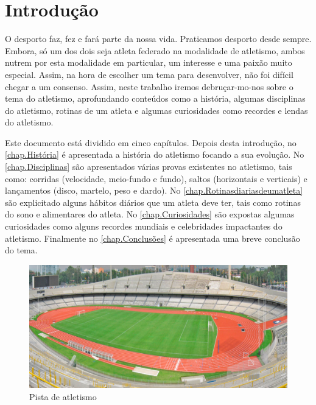 \documentclass{report}
\begin{document}
\clearpage
{}

\chapter{Introdução}
\label{chap.introducao}

O desporto faz, fez e fará parte da nossa vida. Praticamos desporto desde sempre. Embora, só um dos dois seja atleta federado na modalidade de atletismo, ambos nutrem por esta modalidade em particular, um interesse e uma paixão muito especial. Assim, na hora de escolher um tema para desenvolver, não foi difícil chegar a um consenso. Assim, neste trabalho iremos debruçar-mo-nos sobre o tema do atletismo, aprofundando conteúdos como a história, algumas disciplinas do atletismo, rotinas de um atleta e algumas curiosidades como recordes e lendas do atletismo. \par
Este documento está dividido em cinco capítulos.
Depois desta introdução, no \autoref{chap.História} é apresentada a história do atletismo focando a sua evolução. No \autoref{chap.Disciplinas} são apresentados várias provas existentes no atletismo, tais como: corridas (velocidade, meio-fundo e fundo), saltos (horizontais e verticais) e lançamentos (disco, martelo, peso e dardo). No \autoref{chap.Rotinasdiariasdeumatleta} são explicitado alguns hábitos diários que um atleta deve ter, tais como rotinas do sono e alimentares do atleta. No \autoref{chap.Curiosidades} são expostas algumas curiosidades como alguns recordes mundiais e celebridades impactantes do atletismo. Finalmente no \autoref{chap.Conclusões} é apresentada uma breve conclusão do tema.

         \FloatBarrier
            \begin{figure}[h]
            \center
            \includegraphics[scale=.20,angle=0]{pista.jpg}
            \caption{Pista de atletismo}
            \label{fig:pista.2}
            \end{figure}
            \FloatBarrier
\end{document}
